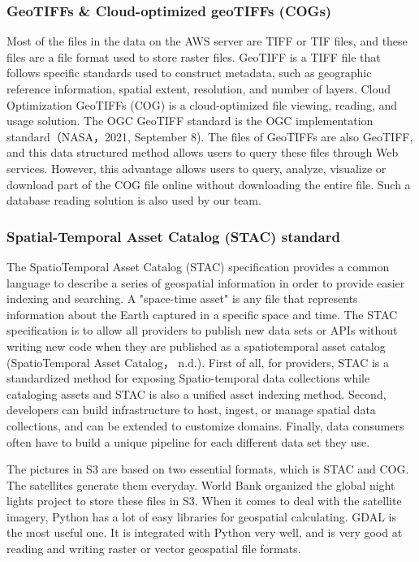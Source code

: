 \documentclass[conference]{IEEEtran}
\begin{document}
\subsubsection{GeoTIFFs & Cloud-optimized geoTIFFs (COGs)}
Most of the files in the data on the AWS server are TIFF or TIF files, and these files are a file format used to store raster files. GeoTIFF is a TIFF file that follows specific standards used to construct metadata, such as geographic reference information, spatial extent, resolution, and number of layers.
Cloud Optimization GeoTIFFs (COG) is a cloud-optimized file viewing, reading, and usage solution. The OGC GeoTIFF standard is the OGC implementation standard（NASA，2021, September 8). The files of GeoTIFFs are also GeoTIFF, and this data structured method allows users to query these files through Web services. However, this advantage allows users to query, analyze, visualize or download part of the COG file online without downloading the entire file. Such a database reading solution is also used by our team.

\subsubsection{Spatial-Temporal Asset Catalog (STAC) standard}
The SpatioTemporal Asset Catalog (STAC) specification provides a common language to describe a series of geospatial information in order to provide easier indexing and searching. A "space-time asset" is any file that represents information about the Earth captured in a specific space and time. The STAC specification is to allow all providers to publish new data sets or APIs without writing new code when they are published as a spatiotemporal asset catalog (SpatioTemporal Asset Catalog， n.d.). First of all, for providers, STAC is a standardized method for exposing Spatio-temporal data collections while cataloging assets and STAC is also a unified asset indexing method. Second, developers can build infrastructure to host, ingest, or manage spatial data collections, and can be extended to customize domains. Finally, data consumers often have to build a unique pipeline for each different data set they use.


	The pictures in S3 are based on two essential formats, which is STAC and COG. The satellites generate them everyday. World Bank organized the global night lights project 
	to store these files in S3. When it comes to deal with the satellite imagery, Python has a lot of easy libraries for geospatial calculating. GDAL is the most useful one. 
	It is integrated with Python very well, and is very good at reading and writing raster or vector geospatial file formats.
	
\end{document}
